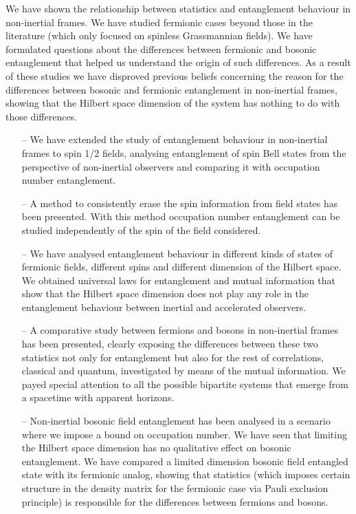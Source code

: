 \begin{list}{}{\leftmargin=1em}
 \item We have shown the relationship between statistics and entanglement behaviour in non-inertial frames. We have studied fermionic cases beyond those in the literature (which only focused on spinless Grassmannian fields). We have formulated questions about the differences between fermionic and bosonic entanglement that helped us understand the origin of such differences. As a result of these studies we have disproved previous beliefs concerning the reason for the differences between bosonic and fermionic entanglement in non-inertial frames, showing that the Hilbert space dimension of the system has nothing to do with those differences.
\begin{itemize}
\item[--] We have extended the study of entanglement behaviour in non-inertial frames to spin 1/2 fields, analysing entanglement of spin Bell states from the perspective of non-inertial observers and comparing it with occupation number entanglement.
\item[--] A method to consistently erase the spin information from field states has been presented. With this method occupation number entanglement can be studied independently of the spin of the field considered.
\item[--] We have analysed entanglement behaviour in different kinds of states of fermionic fields, different spins and different dimension of the Hilbert space. We obtained universal laws for entanglement and mutual information that show that the Hilbert space dimension does not play any role in the  entanglement behaviour between inertial and accelerated observers.
\item[--] A comparative study between fermions and bosons in non-inertial frames has been presented, clearly exposing the differences between these two statistics not only for entanglement but also for the rest of correlations, classical and quantum, investigated by means of the mutual information. We payed special attention to all the possible bipartite systems that emerge from a spacetime with apparent horizons.
\item[--] Non-inertial bosonic field entanglement has been analysed in a scenario where we impose a bound on occupation number. We have seen that limiting the Hilbert space dimension has no qualitative effect on bosonic entanglement. We have compared a limited dimension bosonic field entangled state with its fermionic analog, showing that statistics (which imposes certain structure in the density matrix for the fermionic case via Pauli exclusion principle) is responsible for the differences between fermions and bosons.

\end{itemize}
\end{list}
